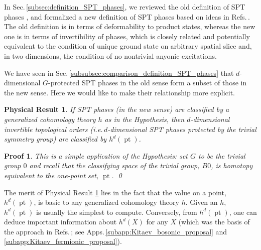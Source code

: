\documentclass[sort&compress]{elsarticle}
\theoremstyle{theoremstyle}
\theoremstyle{framedtheoremstyle}
\newtheorem{rslt}{Physical Result}
\theoremstyle{definitionstyle}
\theoremstyle{definitionstyle}
\theoremstyle{definitionstyle}
\theoremstyle{definitionstyle}
\theoremstyle{nameddefinitionstyle}
\theoremstyle{framednameddefinitionstyle}
\theoremstyle{proofstyle}
\newtheorem{pf}{Proof}
\theoremstyle{definitionstyle}
\newcommand{\paren}[1]{\left( #1 \right)}
\DeclareMathOperator{\pt}{pt}
\begin{document}
In Sec.\,\ref{subsec:definition_SPT_phases}, we reviewed the old definition of SPT phases \cite{Wen_Definition, Cirac}, and formalized a new definition of SPT phases based on ideas in Refs.\,\cite{Kitaev_Stony_Brook_2011_SRE_2, Kitaev_Stony_Brook_2013_SRE, Kapustin_Boson, Freed_SRE_iTQFT, Freed_ReflectionPositivity, McGreevy_sSourcery}. The old definition is in terms of deformability to product states, whereas the new one is in terms of invertibility of phases, which is closely related and potentially equivalent \cite{Kitaev_Stony_Brook_2011_SRE_2, Kitaev_Stony_Brook_2013_SRE, Kapustin_Boson, Freed_SRE_iTQFT, Freed_ReflectionPositivity, McGreevy_sSourcery} to the condition of unique ground state on arbitrary spatial slice and, in two dimensions, the condition of no nontrivial anyonic excitations.

We have seen in Sec.\,\ref{subsubsec:comparison_definition_SPT_phases} that $d$-dimensional $G$-protected SPT phases in the old sense form a subset of those in the new sense.
Here we would like to make their relationship more explicit.

\begin{framed}\begin{rslt}
If SPT phases (in the new sense) are classified by a generalized cohomology theory $h$ as in the Hypothesis, then $d$-dimensional invertible topological orders (i.e.\,$d$-dimensional SPT phases protected by the trivial symmetry group) are classified by $h^d(\pt)$.\label{rslt:invertible_topological_orders}
\end{rslt}\end{framed}

\begin{pf}
This is a simple application of the Hypothesis: set $G$ to be the trivial group $0$ and recall that the classifying space of the trivial group, $B0$, is homotopy equivalent to the one-point set, $\pt$.
\qed\end{pf}

The merit of Physical Result \ref{rslt:invertible_topological_orders} lies in the fact that the value on a point, $h^d\paren{\pt}$, is basic to any generalized cohomology theory $h$. Given an $h$, $h^d\paren{\pt}$ is usually the simplest to compute. Conversely, from $h^d\paren{\pt}$, one can deduce important information about $h^d\paren{X}$ for any $X$ (which was the basis of the approach in Refs.\,\cite{Kitaev_Stony_Brook_2011_SRE_1, Kitaev_Stony_Brook_2013_SRE, Kitaev_IPAM}; see Apps.\,\ref{subapp:Kitaev_bosonic_proposal} and \ref{subapp:Kitaev_fermionic_proposal}).
\end{document}
